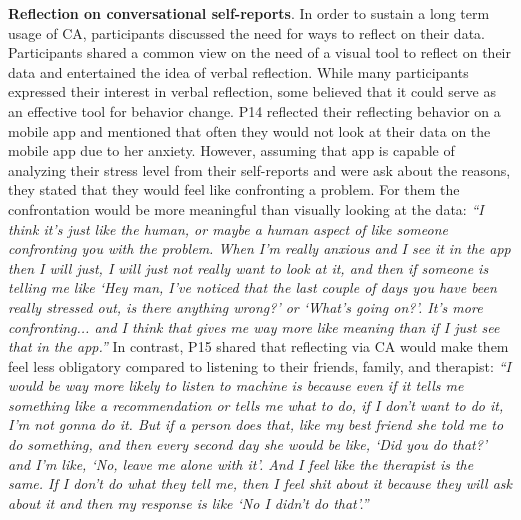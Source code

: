     
    \textbf{Reflection on conversational self-reports}.
        In order to sustain a long term usage of \ac{CA}, participants discussed the need for ways to reflect on their data.
        Participants shared a common view on the need of a visual tool to reflect on their data and entertained the idea of verbal reflection.
        While many participants expressed their interest in verbal reflection, some believed that it could serve as an effective tool for behavior change.
        P14 reflected their reflecting behavior on a mobile app and mentioned that often they would not look at their data on the mobile app due to her anxiety. However, assuming that \acl{app} is capable of analyzing their stress level from their self-reports and were ask about the reasons, they stated that they would feel like confronting a problem. For them the confrontation would be more meaningful than visually looking at the data:
        \textit{``I think it's just like the human, or maybe a human aspect of like someone confronting you with the problem. 
        When I'm really anxious and I see it in the app then I will just, I will just not really want to look at it, and then if someone is telling me like `Hey man, I've noticed that the last couple of days you have been really stressed out, is there anything wrong?' or `What's going on?'. It's more confronting...
        and I think that gives me way more like meaning than if I just see that in the app.''}
        In contrast, P15 shared that reflecting via \ac{CA} would make them feel less obligatory compared to listening to their friends, family, and therapist:
        \textit{``I would be way more likely to listen to machine is because even if it tells me something like a recommendation or tells me what to do, if I don't want to do it, I'm not gonna do it. But if a person does that,
        like my best friend she told me to do something, and then every second day she would be like, `Did you do that?' and I'm like, `No, leave me alone with it'. And I feel like the therapist is the same. If I don't do what they tell me, then I feel shit about it because they will ask about it and then my response is like `No I didn't do that'.''}
